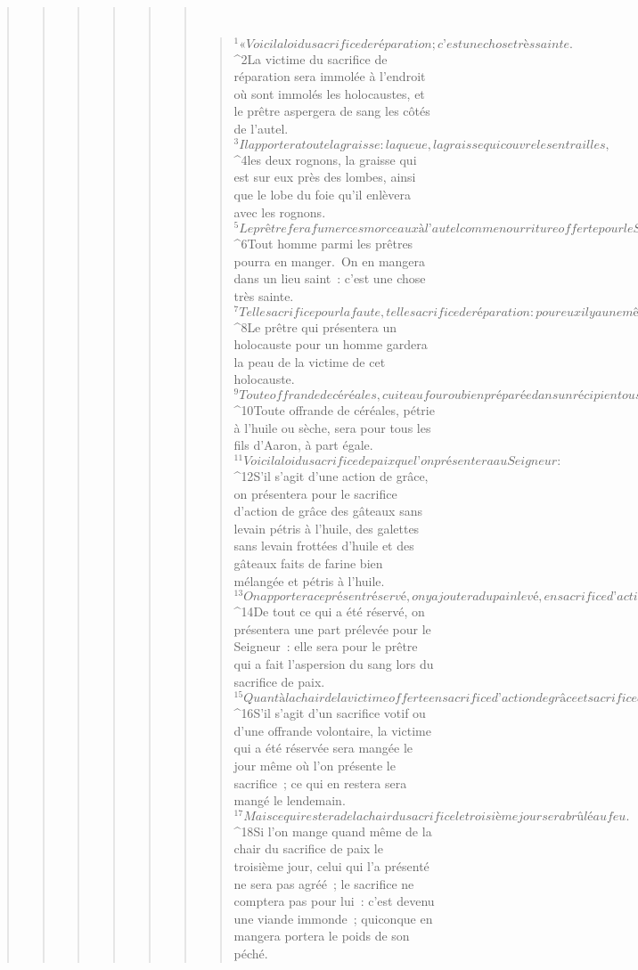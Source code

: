 \begin{verse}
\begin{verse}
\begin{verse}
\begin{verse}
\begin{verse}
\begin{verse}
         
      \bchapter{}
      \begin{verse}
${}^{1}« Voici la loi du sacrifice de réparation ; c’est une chose très sainte. 
${}^{2}La victime du sacrifice de réparation sera immolée à l’endroit où sont immolés les holocaustes, et le prêtre aspergera de sang les côtés de l’autel. 
${}^{3}Il apportera toute la graisse : la queue, la graisse qui couvre les entrailles, 
${}^{4}les deux rognons, la graisse qui est sur eux près des lombes, ainsi que le lobe du foie qu’il enlèvera avec les rognons. 
${}^{5}Le prêtre fera fumer ces morceaux à l’autel comme nourriture offerte pour le Seigneur. C’est un sacrifice de réparation. 
${}^{6}Tout homme parmi les prêtres pourra en manger. On en mangera dans un lieu saint : c’est une chose très sainte.
${}^{7}Tel le sacrifice pour la faute, tel le sacrifice de réparation : pour eux il y a une même loi. La victime sera pour le prêtre qui a accompli le rite d’expiation. 
${}^{8}Le prêtre qui présentera un holocauste pour un homme gardera la peau de la victime de cet holocauste. 
${}^{9}Toute offrande de céréales, cuite au four ou bien préparée dans un récipient ou sur une plaque, sera pour le prêtre qui l’aura présentée. 
${}^{10}Toute offrande de céréales, pétrie à l’huile ou sèche, sera pour tous les fils d’Aaron, à part égale.
${}^{11}Voici la loi du sacrifice de paix que l’on présentera au Seigneur : 
${}^{12}S’il s’agit d’une action de grâce, on présentera pour le sacrifice d’action de grâce des gâteaux sans levain pétris à l’huile, des galettes sans levain frottées d’huile et des gâteaux faits de farine bien mélangée et pétris à l’huile. 
${}^{13}On apportera ce présent réservé, on y ajoutera du pain levé, en sacrifice d’action de grâce et sacrifice de paix. 
${}^{14}De tout ce qui a été réservé, on présentera une part prélevée pour le Seigneur : elle sera pour le prêtre qui a fait l’aspersion du sang lors du sacrifice de paix. 
${}^{15}Quant à la chair de la victime offerte en sacrifice d’action de grâce et sacrifice de paix, elle sera mangée le jour même où elle est présentée ; on n’en gardera rien pour le lendemain matin.
${}^{16}S’il s’agit d’un sacrifice votif ou d’une offrande volontaire, la victime qui a été réservée sera mangée le jour même où l’on présente le sacrifice ; ce qui en restera sera mangé le lendemain. 
${}^{17}Mais ce qui restera de la chair du sacrifice le troisième jour sera brûlé au feu. 
${}^{18}Si l’on mange quand même de la chair du sacrifice de paix le troisième jour, celui qui l’a présenté ne sera pas agréé ; le sacrifice ne comptera pas pour lui : c’est devenu une viande immonde ; quiconque en mangera portera le poids de son péché.

\end{verse}
\end{verse}
\end{verse}
\end{verse}
\end{verse}
\end{verse}
\end{verse}
